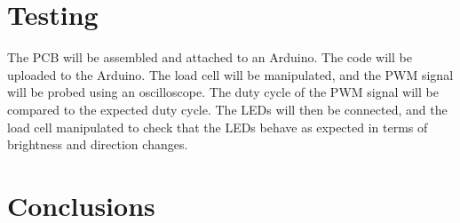 \documentclass[twoside]{article}
\begin{document}
\section{Testing}
    The PCB will be assembled and attached to an Arduino. The code will be uploaded to the Arduino. The load cell will be manipulated, and the PWM signal will be probed using an oscilloscope. The duty cycle of the PWM signal will be compared to the expected duty cycle.
    The LEDs will then be connected, and the load cell manipulated to check that the LEDs behave as expected in terms of brightness and direction changes. 

\section{Conclusions}
\newpage
\printbibliography
\end{document}
